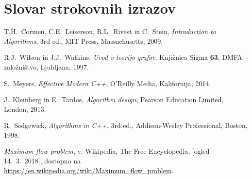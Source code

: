 \documentclass[mat1]{fmfdelo}
\begin{document}
\newpage


\section*{Slovar strokovnih izrazov}



\begin{thebibliography}{99}

T.H.~Cormen, C.E.~Leiserson, R.L.~Rivest in C.~Stein, \emph{Introduction to Algorithms}, 3rd ed., MIT Press, Massachusetts, 2009.

R.J.~Wilson in J.J.~Watkins, \emph{Uvod v teorijo grafov}, Knjižnica Sigma \textbf{63}, DMFA -- založništvo, Ljubljana, 1997.

S.~Meyers, \emph{Effective Modern C++}, O'Reilly Media, Kalifornija, 2014.

J.~Kleinberg in E.~Tardos, \emph{Algorithm design}, Pearson Education Limited, London, 2013.

R.~Sedgewick, \emph{Algorithms in C++}, 3rd ed., Addison-Wesley Professional, Boston, 1998.

\emph{Maximum flow problem}, v: Wikipedia, The Free Encyclopedia, [ogled 14.~3.~2018], dostopno na \url{https://en.wikipedia.org/wiki/Maximum_flow_problem}.

\end{thebibliography}
\end{document}
